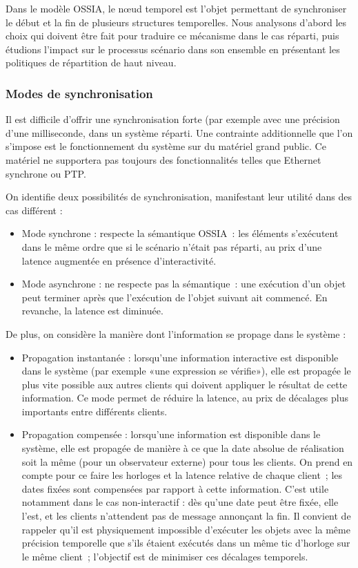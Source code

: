 \documentclass{article}
\newcommand\ossia{OSSIA\xspace}
\begin{document}
Dans le modèle \ossia, le nœud temporel est l'objet permettant de synchroniser le début et la fin de plusieurs structures temporelles. 
Nous analysons d'abord les choix qui doivent être fait pour traduire ce mécanisme dans le cas réparti, puis étudions l'impact sur le processus scénario dans son ensemble en présentant les politiques de répartition de haut niveau.
\subsubsection{Modes de synchronisation}
Il est difficile d'offrir une synchronisation forte (par exemple avec une précision d'une milliseconde, dans un système réparti\cite{sheehy2015there}. 
Une contrainte additionnelle que l'on s'impose est le fonctionnement du système sur du matériel grand public. 
Ce matériel ne supportera pas toujours des fonctionnalités telles que Ethernet synchrone\cite{ferrant2008synchronous} ou PTP.


On identifie deux possibilités de synchronisation, manifestant leur utilité dans des cas différent : 
\begin{itemize}
	\item Mode synchrone : respecte la sémantique \ossia{}~: les éléments s'exécutent dans le même ordre que si le scénario n'était pas réparti, au prix d'une latence augmentée en présence d'interactivité.
	\item Mode asynchrone : ne respecte pas la sémantique~: une exécution d'un objet peut terminer après que l'exécution de l'objet suivant ait commencé. En revanche, la latence est diminuée.    
\end{itemize}

De plus, on considère la manière dont l'information se propage dans le système :

\begin{itemize}
	\item Propagation instantanée : lorsqu'une information interactive est disponible dans le système (par exemple «une expression se vérifie»), elle est propagée le plus vite possible aux autres clients qui doivent appliquer le résultat de cette information. 
    Ce mode permet de réduire la latence, au prix de décalages plus importants entre différents clients.
	\item Propagation compensée : lorsqu'une information est disponible dans le système, elle est propagée de manière à ce que la date absolue de réalisation soit la même (pour un observateur externe) pour tous les clients. 
	On prend en compte pour ce faire les horloges et la latence relative de chaque client~; les dates fixées sont compensées par rapport à cette information.
	C'est utile notamment dans le cas non-interactif : dès qu'une date peut être fixée, elle l'est, et les clients n'attendent pas de message annonçant la fin. 
	Il convient de rappeler qu'il est physiquement impossible d'exécuter les objets avec la même précision temporelle que s'ils étaient exécutés dans un même tic d'horloge sur le même client~; l'objectif est de minimiser ces décalages temporels.
\end{itemize}
\end{document}
